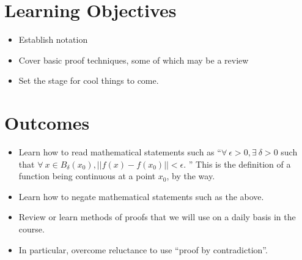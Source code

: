 
\section*{Learning Objectives}

\begin{itemize}
\item Establish notation
\item Cover basic proof techniques, some of which may be a review
\item Set the stage for cool things to come.
\end{itemize}

\section*{Outcomes} 
\begin{itemize}
\item Learn how to read mathematical statements such as ``$\forall~\epsilon>0, \exists~\delta>0$ such that $\forall~x\in B_\delta(x_0),  ||f(x) - f(x_0)|| < \epsilon$. '' This is the definition of a function being continuous at a point $x_0$, by the way.

\item Learn how to negate mathematical statements such as the above.
 
\item Review or learn methods of proofs that we will use on a daily basis in the course.

\item In particular, overcome reluctance to use ``proof by contradiction''. 
\end{itemize}

\newpage


